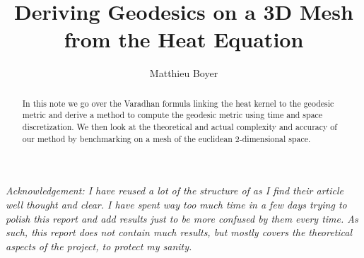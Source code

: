 \documentclass[math, info, english]{cours}
\title{Deriving Geodesics on a 3D Mesh from the Heat Equation}
\author{Matthieu Boyer}
\begin{document}
\bettertitle

\begin{center}
	\begin{minipage}{.5\linewidth}
\emph{Acknowledgement: I have reused a lot of the structure of \cite{heatgeodesics} as I find their article well thought and clear.
	I have spent way too much time in a few days trying to polish this report and add results just to be more confused by them every time.
	As such, this report does not contain much results, but mostly covers the theoretical aspects of the project, to protect my sanity.}
	\end{minipage}
\end{center}


\begin{abstract}
	In this note we go over the Varadhan formula linking the heat kernel to the geodesic metric and derive a method to compute the geodesic metric using time and space discretization.
	We then look at the theoretical and actual complexity and accuracy of our method by benchmarking on a mesh of the euclidean $2$-dimensional space.
\end{abstract}
\end{document}

